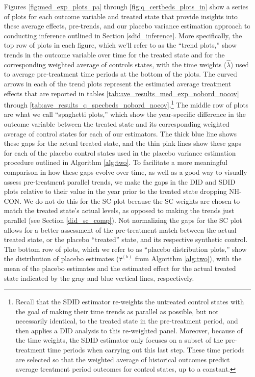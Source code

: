 \documentclass[../Main.tex]{subfiles}
\begin{document}
\indent Figures \ref{fig:med_exp_plots_pa} through \ref{fig:q_certbeds_plots_in} show a series of plots for each outcome variable and treated state that provide insights into these average effects, pre-trends, and our placebo variance estimation approach to conducting inference outlined in Section \ref{sdid_inference}. More specifically, the top row of plots in each figure, which we'll refer to as the ``trend plots,'' show trends in the outcome variable over time for the treated state and for the corresponding weighted average of controls states, with the time weights ($\hat{\lambda}$) used to average pre-treatment time periods at the bottom of the plots. The curved arrows in each of the trend plots represent the estimated average treatment effects that are reported in tables \ref{tab:ave_results_med_exp_nobord_nocov} through \ref{tab:ave_results_q_specbeds_nobord_nocov}.\footnote{Recall that the SDID estimator re-weights the untreated control states with the goal of making their time trends as parallel as possible, but not necessarily identical, to the treated state in the pre-treatment period, and then applies a DID analysis to this re-weighted panel. Moreover, because of the time weights, the SDID estimator only focuses on a subset of the pre-treatment time periods when carrying out this last step. These time periods are selected so that the weighted average of historical outcomes predict average treatment period outcomes for control states, up to a constant.} The middle row of plots are what we call ``spaghetti plots,'' which show the year-specific difference in the outcome variable between the treated state and its corresponding weighted average of control states for each of our estimators. The thick blue line shows these gaps for the actual treated state, and the thin pink lines show these gaps for each of the placebo control states used in the placebo variance estimation procedure outlined in Algorithm \ref{alg:two}. To facilitate a more meaningful comparison in how these gaps evolve over time, as well as a good way to visually assess pre-treatment parallel trends, we make the gaps in the DID and SDID plots relative to their value in the year prior to the treated state dropping NH-CON. We do not do this for the SC plot because the SC weights are chosen to match the treated state's actual levels, as opposed to making the trends just parallel (see Section \ref{did_sc_comp}). Not normalizing the gaps for the SC plot allows for a better assessment of the pre-treatment match between the actual treated state, or the placebo ``treated'' state, and its respective synthetic control. The bottom row of plots, which we refer to as ``placebo distribution plots,'' show the distribution of placebo estimates ($\hat{\tau}^{(b)}$ from Algorithm \ref{alg:two}), with the mean of the placebo estimates and the estimated effect for the actual treated state indicated by the gray and blue vertical lines, respectively.
\end{document}
